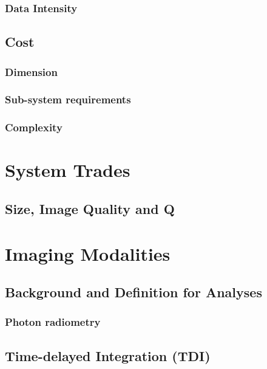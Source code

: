 \documentclass[10pt,journal]{IEEEtran}  %
\begin{document}
\subsubsection{Data Intensity}

\subsection{Cost}
\label{sec:cost}

\subsubsection{Dimension}

\subsubsection{Sub-system requirements}

\subsubsection{Complexity}

\section{System Trades}
\label{sec:trades}

\subsection{Size, Image Quality and Q}

\section{Imaging Modalities}
\label{sec:modalities}

\subsection{Background and Definition for Analyses}
\label{sec:analyses_background}

\subsubsection{Photon radiometry}

\subsection{Time-delayed Integration (TDI)}
\label{sec:tdi}
\end{document}
